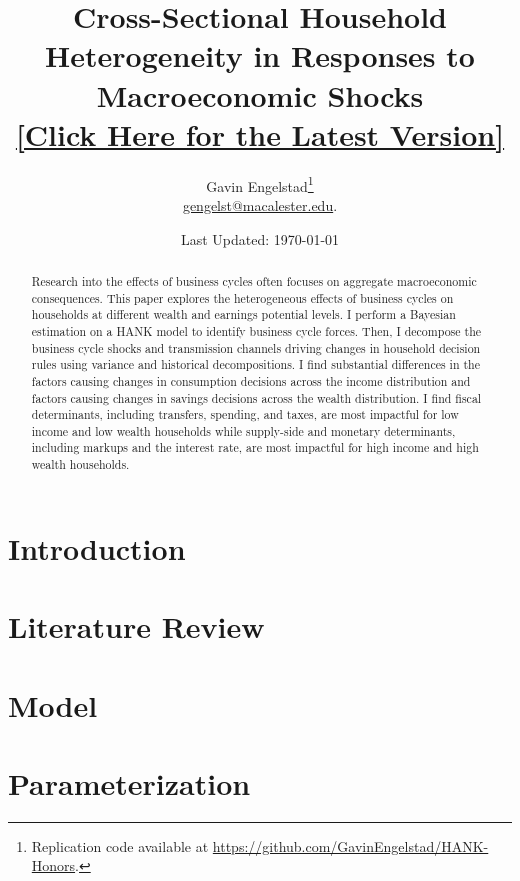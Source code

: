 \documentclass[11pt]{article}
\title{Cross-Sectional Household Heterogeneity in Responses to Macroeconomic Shocks \\ {\large \href{https://gavinengelstad.github.io/assets/pdf/hank/paper.pdf}{[Click Here for the Latest Version]}}}
\author{Gavin Engelstad\thanks{Replication code available at \url{https://github.com/GavinEngelstad/HANK-Honors}.} \\ \href{mailto:gengelst@macalester.edu}{gengelst@macalester.edu}.}
\date{Last Updated: \today}
\numberwithin{equation}{section} %
\numberwithin{figure}{section} %
\numberwithin{table}{section} %
\begin{document}
\maketitle

\begin{abstract}
  Research into the effects of business cycles often focuses on aggregate macroeconomic consequences. This paper explores the heterogeneous effects of business cycles on households at different wealth and earnings potential levels. I perform a Bayesian estimation on a HANK model to identify business cycle forces. Then, I decompose the business cycle shocks and transmission channels driving changes in household decision rules using variance and historical decompositions. I find substantial differences in the factors causing changes in consumption decisions across the income distribution and factors causing changes in savings decisions across the wealth distribution. I find fiscal determinants, including transfers, spending, and taxes, are most impactful for low income and low wealth households while supply-side and monetary determinants, including markups and the interest rate, are most impactful for high income and high wealth households.


\end{abstract}
\newpage

\section{Introduction} \label{sec:intro}


\section{Literature Review} \label{sec:lit-review}


\section{Model}
 \label{sec:model}

\section{Parameterization} \label{sec:params}

\end{document}
